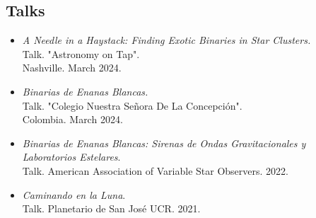 \documentclass[letterpaper,10pt]{article}
\begin{document}
\subsection*{Talks}
\begin{itemize}[label=$\blacktriangleright$]

\item \textit{A Needle in a Haystack: Finding Exotic Binaries in Star Clusters.} \\
Talk. "Astronomy on Tap". \\
Nashville. March 2024.


\item \textit{Binarias de Enanas Blancas.} \\
Talk. "Colegio Nuestra Se\~{n}ora De La Concepci\'on". \\
Colombia. March 2024.




\item \textit{Binarias de Enanas Blancas: Sirenas de Ondas Gravitacionales y Laboratorios Estelares}. \\
Talk. American Association of Variable Star Observers. 2022.




\item \textit{Caminando en la Luna}. \\
Talk. Planetario de San Jos\'e UCR. 2021.
\end{itemize}






\end{document}
